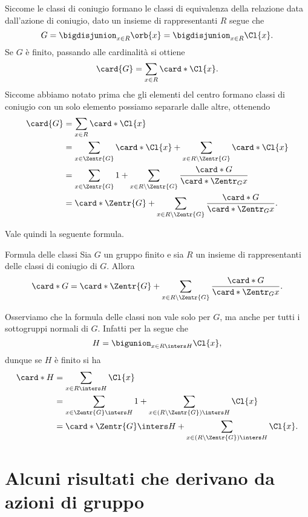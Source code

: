 Siccome le classi di coniugio formano le classi di equivalenza della relazione data dall'azione di coniugio, dato un insieme di rappresentanti $R$ segue che \[
    G = \bigdisjunion_{x \in R} \orb{x} = \bigdisjunion_{x \in R} \Cl{x}.
\] Se $G$ è finito, passando alle cardinalità si ottiene \[
    \card{G} = \sum_{x \in R} \card*{\Cl{x}}. 
\] Siccome abbiamo notato prima che gli elementi del centro formano classi di coniugio con un solo elemento possiamo separarle dalle altre, ottenendo
\begin{align*}
    \card{G} &= \sum_{x \in R} \card*{\Cl{x}}\\
    &= \sum_{x \in \Zentr{G}} \card*{\Cl{x}} + \sum_{x \in R \setminus \Zentr{G}} \card*{\Cl{x}}\\
    &= \sum_{x \in \Zentr{G}} 1 + \sum_{x \in R \setminus \Zentr{G}} \frac{\card*{G}}{\card*{\Zentr_{G}{x}}}\\
    &= \card*{\Zentr{G}} + \sum_{x \in R \setminus \Zentr{G}} \frac{\card*{G}}{\card*{\Zentr_{G}{x}}}.
\end{align*}

Vale quindi la seguente formula.
\begin{theorem}
    {Formula delle classi}{}
    Sia $G$ un gruppo finito e sia $R$ un insieme di rappresentanti delle classi di coniugio di $G$.
    Allora \begin{equation}
        \label{eq:class_formula}
        \card*{G} = \card*{\Zentr{G}} + \sum_{x \in R \setminus \Zentr{G}} \frac{\card*{G}}{\card*{\Zentr_{G}{x}}}.
    \end{equation}
\end{theorem}

Osserviamo che la formula delle classi non vale solo per $G$, ma anche per tutti i sottogruppi normali di $G$. Infatti per la  segue che \[
    H = \bigunion_{x \in R \inters H} \Cl{x},    
\] dunque se $H$ è finito si ha \begin{align*}
    \card*{H} &= \sum_{x \in R \inters H} \Cl{x}\\
    &= \sum_{x \in \Zentr{G} \inters H} 1 + \sum_{{x \in (R \setminus \Zentr{G}) \inters H}} \Cl{x}\\
    &= \card*{\Zentr{G} \inters H} + \sum_{{x \in (R \setminus \Zentr{G}) \inters H}} \Cl{x}. 
\end{align*}

\section{Alcuni risultati che derivano da azioni di gruppo}

